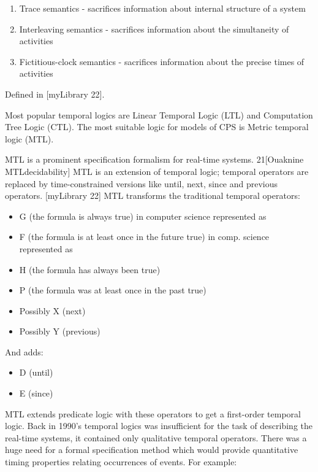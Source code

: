 \begin{enumerate}
	\item Trace semantics - sacrifices information about internal structure of a system
	\item Interleaving semantics - sacrifices information about the simultaneity of activities
	\item Fictitious-clock semantics - sacrifices information about the precise times of activities
\end{enumerate}
Defined in [myLibrary 22].

Most popular temporal logics are Linear Temporal Logic (LTL) and Computation Tree Logic (CTL). The most suitable logic for models of CPS is Metric temporal logic (MTL).

MTL is a prominent specification formalism for real-time systems. 21[Ouaknine MTLdecidability] MTL is an extension of temporal logic; temporal operators are replaced by time-constrained versions like until, next, since and previous operators. [myLibrary 22] MTL transforms the traditional temporal operators:

\begin{itemize}
	\item G (the formula is always true) in computer science represented as
	\item F (the formula is at least once in the future true) in comp. science represented as
	\item H (the formula has always been true)
	\item P (the formula was at least once in the past true)
	\item Possibly X (next)
	\item Possibly Y (previous)
\end{itemize}

And adds:

\begin{itemize}
	\item D (until)
	\item E (since)
\end{itemize}

MTL extends predicate logic with these operators to get a first-order temporal logic. Back in 1990’s temporal logics was insufficient for the task of describing the real-time systems, it contained only qualitative temporal operators. There was a huge need for a formal specification method which would provide quantitative timing properties relating occurrences of events. For example:

